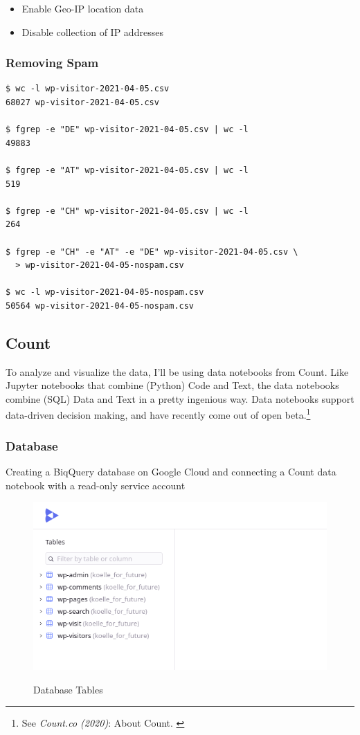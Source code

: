 \begin{itemize}
 \item Enable Geo-IP location data
 \item Disable collection of IP addresses
\end{itemize}

\subsubsection{Removing Spam}

\begin{lstlisting}[caption=Shell script: Removing Spam, frame=single, basicstyle=\ttfamily]
$ wc -l wp-visitor-2021-04-05.csv
68027 wp-visitor-2021-04-05.csv

$ fgrep -e "DE" wp-visitor-2021-04-05.csv | wc -l
49883

$ fgrep -e "AT" wp-visitor-2021-04-05.csv | wc -l
519

$ fgrep -e "CH" wp-visitor-2021-04-05.csv | wc -l
264

$ fgrep -e "CH" -e "AT" -e "DE" wp-visitor-2021-04-05.csv \
  > wp-visitor-2021-04-05-nospam.csv

$ wc -l wp-visitor-2021-04-05-nospam.csv 
50564 wp-visitor-2021-04-05-nospam.csv
\end{lstlisting}

\subsection{Count}

To analyze and visualize the data, I'll be using data notebooks from Count. Like Jupyter notebooks that combine (Python) Code and Text, the data notebooks combine (SQL) Data and Text in a pretty ingenious way. Data notebooks support data-driven decision making, and have recently come out of open beta.\footnote{See \textit{Count.co (2020)}: About Count. \cite{aboutCount}}

\subsubsection{Database}

Creating a BiqQuery database on Google Cloud and connecting a Count data notebook with a read-only service account

\begin{figure}[H]
\centering
\caption {Database Tables}
\includegraphics[width=\linewidth]{images/tables.png}
\label{fig:tablesCount}
\end{figure}
